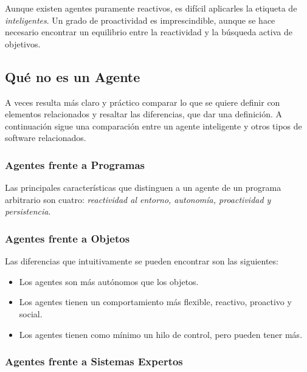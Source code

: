 Aunque existen agentes puramente reactivos, es difícil aplicarles la etiqueta
de {\em inteligentes}. Un grado de proactividad es imprescindible, aunque se
hace necesario encontrar un equilibrio entre la reactividad y la búsqueda
activa de objetivos.


\subsection*{Qué no es un Agente}


A veces resulta más claro y práctico comparar lo que se quiere definir con
elementos relacionados y resaltar las diferencias, que dar una definición. A
continuación sigue una comparación entre un agente inteligente y otros tipos de
software relacionados.

\subsubsection*{Agentes frente a Programas}

Las principales características que distinguen a un agente de un programa
arbitrario son cuatro: {\em reactividad al entorno, autonomía, proactividad y
persistencia}.


\subsubsection*{Agentes frente a Objetos}

Las diferencias que intuitivamente se pueden encontrar son las siguientes:

\begin{itemize}
 \item Los agentes son más autónomos que los objetos.
 \item Los agentes tienen un comportamiento más flexible, reactivo, proactivo
 y social.
 \item Los agentes tienen como mínimo un hilo de control, pero pueden tener más.
\end{itemize}


\subsubsection*{Agentes frente a Sistemas Expertos}

